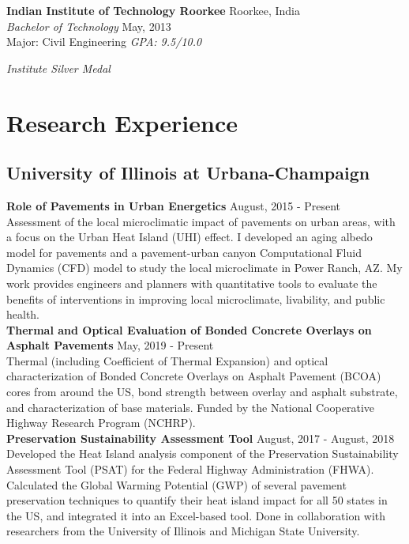 \documentclass[12pt]{article}
\begin{document}
\textbf{Indian Institute of Technology Roorkee} \hfill Roorkee, India\\
\textit{Bachelor of Technology} \hfill May, 2013\\
Major: Civil Engineering \hfill \textit{GPA: 9.5/10.0} \\
\strut \hfill \textit{Institute Silver Medal} \\ %

\section*{Research Experience}
\subsection*{University of Illinois at Urbana-Champaign}
\textbf{Role of Pavements in Urban Energetics} \hfill August, 2015 - Present \\
Assessment of the local microclimatic impact of pavements on urban areas, with a focus on the Urban Heat Island (UHI) effect. I developed an aging albedo model for pavements and a pavement-urban canyon Computational Fluid Dynamics (CFD) model to study the local microclimate in Power Ranch, AZ. My work provides engineers and planners with quantitative tools to evaluate the benefits of interventions in improving local microclimate, livability, and public health.\\

\textbf{Thermal and Optical Evaluation of Bonded Concrete Overlays on Asphalt Pavements} \hfill May, 2019 - Present \\
Thermal (including Coefficient of Thermal Expansion) and optical characterization of Bonded Concrete Overlays on Asphalt Pavement (BCOA) cores from around the US, bond strength between overlay and asphalt substrate, and characterization of base materials. Funded by the National Cooperative Highway Research Program (NCHRP).\\

\textbf{Preservation Sustainability Assessment Tool} \hfill August, 2017 - August, 2018\\
Developed the Heat Island analysis component of the Preservation Sustainability Assessment Tool (PSAT) for the Federal Highway Administration (FHWA). Calculated the Global Warming Potential (GWP) of several pavement preservation techniques to quantify their heat island impact for all 50 states in the US, and integrated it into an Excel-based tool. Done in collaboration with researchers from the University of Illinois and Michigan State University. \\
\end{document}
